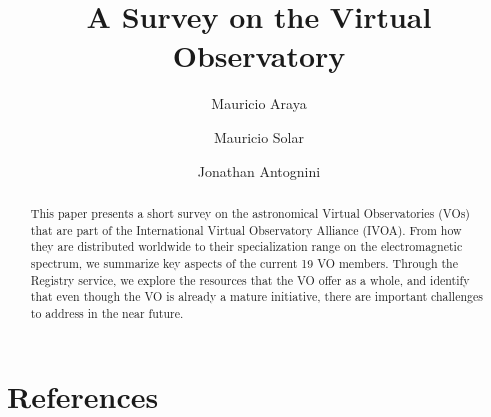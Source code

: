\documentclass[preprint]{elsarticle}
\begin{document}
\title{A Survey on the Virtual Observatory}

\author[utfsm]{Mauricio Araya}


\author[utfsm]{Mauricio Solar}


\author[utfsm]{Jonathan Antognini}


\address[utfsm]{Universidad T\'ecnica Federico Santa Mar\'ia\\
Avenida Espa\~na 1680, Valpara\'iso, Chile}

\begin{abstract}
This paper presents a short survey on the astronomical Virtual Observatories (VOs) that are 
part of the International Virtual Observatory Alliance (IVOA). From how they are
distributed worldwide to their specialization range on the electromagnetic spectrum, 
we summarize key aspects of the current 19 VO members. Through the Registry
service, we explore the resources that the VO offer as a whole, and identify 
that even though the VO is already a mature initiative, there are important
challenges to address in the near future.
\end{abstract}

\maketitle
















\section{References}





%



\end{document}
